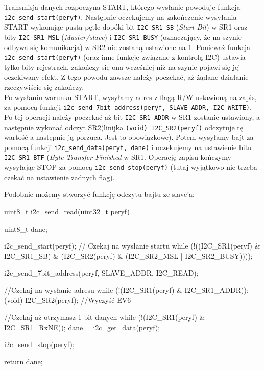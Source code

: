 \documentclass{pdfBooklets}
\begin{document}
Transmisja danych rozpoczyna START, którego wysłanie powoduje funkcja \Verb$i2c_send_start(peryf)$. Następnie oczekujemy na zakończenie wysyłania
START wykonując pustą pętle dopóki bit \Verb$I2C_SR1_SB$ (\textit{Start Bit}) w SR1 oraz bity \Verb$I2C_SR1_MSL$ (\textit{Master/slave}) i
\Verb$I2C_SR1_BUSY$ (oznaczający, że na szynie odbywa się komunikacja) w SR2 nie zostaną ustawione na 1. Ponieważ funkcja \Verb$i2c_send_start(peryf)$
(oraz inne funkcje związane z kontrolą I2C) ustawia tylko bity rejestrach, zakończy się ona wcześniej niż na szynie pojawi się jej oczekiwany
efekt. Z tego powodu zawsze należy poczekać, aż żądane działanie rzeczywiście się zakończy.\\

Po wysłaniu warunku START, wysyłamy adres z flagą R/W ustawioną na zapis, za pomocą funkcji
\Verb$i2c_send_7bit_address(peryf, SLAVE_ADDR, I2C_WRITE)$. Po tej operacji należy poczekać aż bit \Verb$I2C_SR1_ADDR$ w SR1 zostanie ustawiony, a
następnie wykonać odczyt SR2\footnotemark (linijka \Verb$(void) I2C_SR2(peryf)$ odczytuje tę wartość a następnie ją porzuca. Jest to obowiązkowe).
Potem wysyłamy bajt za pomocą funkcji \Verb$i2c_send_data(peryf, dane)$ i oczekujemy na ustawienie bitu \Verb$I2C_SR1_BTF$ (\textit{Byte Transfer
  Finished} w SR1. Operację zapisu kończymy wysyłając STOP za pomocą \Verb$i2c_send_stop(peryf)$ (tutaj wyjątkowo nie trzeba czekać na ustawienie żadnych flag).\\

  


Podobnie możemy stworzyć funkcję odczytu bajtu ze slave'a:

\begin{CodeFrame*}[c]{}
uint8_t i2c_send_read(uint32_t peryf){
  uint8_t dane;
  
  i2c_send_start(peryf);
  // Czekaj na wysłanie startu
  while (!((I2C_SR1(peryf) & I2C_SR1_SB)
	   & (I2C_SR2(peryf) & (I2C_SR2_MSL | I2C_SR2_BUSY))));
  
  i2c_send_7bit_address(peryf, SLAVE_ADDR, I2C_READ);

  //Czekaj na wysłanie adresu
  while (!(I2C_SR1(peryf) & I2C_SR1_ADDR));
  (void) I2C_SR2(peryf); //Wyczyść EV6

  //Czekaj aż otrzymasz 1 bit danych
  while (!(I2C_SR1(peryf) & I2C_SR1_RxNE));
  dane = i2c_get_data(peryf);
  
 
  i2c_send_stop(peryf);

  return dane;
}
\end{CodeFrame*}
\end{document}
